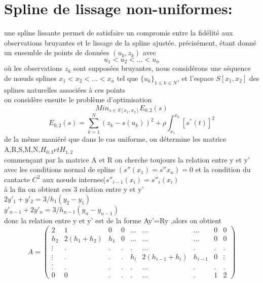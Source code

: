 \documentclass[11pt]{report}
\begin{document}
\chapter*{Spline de lissage non-uniformes:}
une spline lissante permet de satisfaire un compromis entre la fidélité aux observations bruyantes et le lissage de la spline ajustée. précisément, étant donné un ensemble de points de données $(u_k,z_k)$ avec $$u_{1}<u_{2}< ... <u_{n}$$
où les observations $z_k$ sont supposées bruyantes, nous considérons une séquence de nœuds splines $x_{1}< x_{2}<... < x_{n}$
tel que $\{{u_k}\}_{1 \leq k \leq N}$, et l'espace $S[x_1,x_2]$ des splines naturelles associées à ces points \\
on considère ensuite le problème d'optimisation $$Min_{s \in S[x_1,x_2]}E_{0,2}(s)$$
$$E_{0,2}(s)=\sum_{k=1}^{N}(z_k-s(u_k))^2+\rho\int_{x_1}^{x_n}[s^{''}(t)]^2$$
de la même maniéré que dans le cas uniforme, on détermine les matrice A,R,S,M,N,$H_{0,3} et H_{1,2}$\\
commençant par la matrice A et R on cherche toujours la relation entre y et y' avec les conditions normal de  spline 
$(s''(x_1)=s''x_n)=0$ et la condition du cantacte $C^2$ aux nœuds internes($s''_{i-1}(x_i)=s''_i(x_i)$\\
à la fin on obtient ces 3 relation entre y et y'\\
$2y'_1+y'_2=3/h_1(y_2-y_1)$\\
$y'_{n-1}+2y'_n=3/h_{n-1}(y_n-y_{n-1})$\\
donc la relation entre y et y' est de la forme Ay'=Ry ,alors on obtient \\
$$A=\begin{pmatrix} 2&1&0&0&...&...&...&0&0 \\ h_2&2(h_1+h_2)&h_1&0&...&...&...&0&0 \\ \vdots&.&.&.&.&...&.&.&.\\ \vdots&.&.&.&h_i&2(h_{i-1}+h_i)&h_{i-1}&0&\vdots \\. \\.&.&.&.&.&...&.&.&. \\ 0&0&.&.&.&...&.&1&2 \end{pmatrix}$$\\
\end{document}
